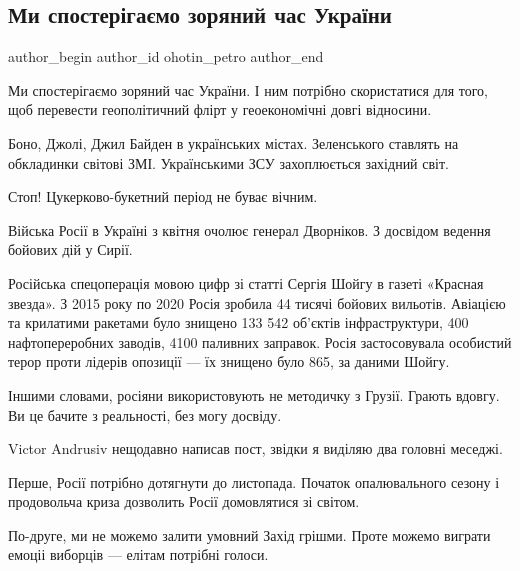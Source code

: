  
 
 
 
 
 
\subsection{Ми спостерігаємо зоряний час України}
\label{sec:09_05_2022.fb.ohotin_petro.1.zorjanyj_chas_ukrainy}
 
\ifcmt
 author_begin
   author_id ohotin_petro
 author_end
\fi

Ми спостерігаємо зоряний час України. І ним потрібно скористатися для того, щоб
перевести геополітичний флірт у геоекономічні довгі відносини. 

Боно, Джолі, Джил Байден в українських містах. Зеленського ставлять на
обкладинки світові ЗМІ. Українськими ЗСУ захоплюється західний світ. 

Стоп! Цукерково-букетний період не буває вічним. 

Війська Росії в Україні  з квітня очолює генерал Дворніков. З досвідом ведення
бойових дій у Сирії. 

Російська спецоперація мовою цифр зі статті Сергія Шойгу в газеті «Красная
звезда». З 2015 року по 2020 Росія зробила 44 тисячі бойових вильотів. Авіацією
та крилатими ракетами було знищено 133 542  об'єктів інфраструктури, 400
нафтопереробних заводів, 4100 паливних заправок. Росія застосовувала особистий
терор проти лідерів опозиції — їх знищено було 865, за даними Шойгу. 

Іншими словами, росіяни використовують не методичку з Грузії. Грають вдовгу. Ви
це бачите з реальності, без могу досвіду. 

Victor Andrusiv нещодавно написав пост, звідки я виділяю два головні меседжі. 

Перше, Росії потрібно дотягнути до листопада. Початок опалювального сезону і
продовольча криза дозволить Росії домовлятися зі світом.

По-друге, ми не можемо залити умовний Захід грішми. Проте можемо виграти емоціі
виборців — елітам потрібні голоси. 

